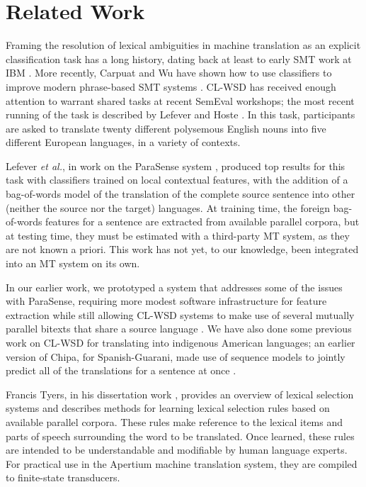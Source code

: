 \section{Related Work}
Framing the resolution of lexical ambiguities in machine translation
as an explicit classification
task has a long history, dating back at least to early SMT work at IBM
\cite{Brown91word-sensedisambiguation}.  More recently, Carpuat and Wu have
shown how to use classifiers to improve modern phrase-based SMT systems
\cite{carpuatpsd}.
CL-WSD has received enough attention to warrant shared tasks at recent SemEval
workshops; the most recent running of the task is described by Lefever and
Hoste \cite{task10}.
In this task, participants are asked to translate twenty different polysemous
English nouns into five different European languages, in a variety of contexts.

Lefever \emph{et al.}, in work on the ParaSense system
\cite{lefever-hoste-decock:2011:ACL-HLT2011}, produced top results for
this task with classifiers trained on local contextual features, with the 
addition of a bag-of-words model of the translation of the complete source
sentence into other (neither the source nor the target) languages. At training
time, the foreign bag-of-words features for a sentence are extracted from
available parallel corpora, but at testing time, they must be
estimated with a third-party MT system, as they are not known a priori.
This work has not yet, to our knowledge, been integrated into an MT system
on its own.

In our earlier work, we prototyped a system that addresses some of the issues
with ParaSense, requiring more modest software infrastructure for feature
extraction while still allowing CL-WSD systems to make use of several mutually
parallel bitexts that share a source language
\cite{rudnick-liu-gasser:2013:SemEval-2013}.
We have also done some previous work on CL-WSD for translating into indigenous
American languages; an earlier version of Chipa, for Spanish-Guarani, made use
of sequence models to jointly predict all of the translations for a sentence at
once \cite{rudnick-gasser:2013:HyTra}.

Francis Tyers, in his dissertation work \cite{tyers-dissertation},
provides an overview of lexical selection systems and describes methods for
learning lexical selection rules based on available parallel corpora. These
rules make reference to the lexical items and parts of speech surrounding the
word to be translated. Once learned, these rules are intended to be
understandable and modifiable by human language experts. For practical use in
the Apertium machine translation system, they are compiled to finite-state
transducers.

